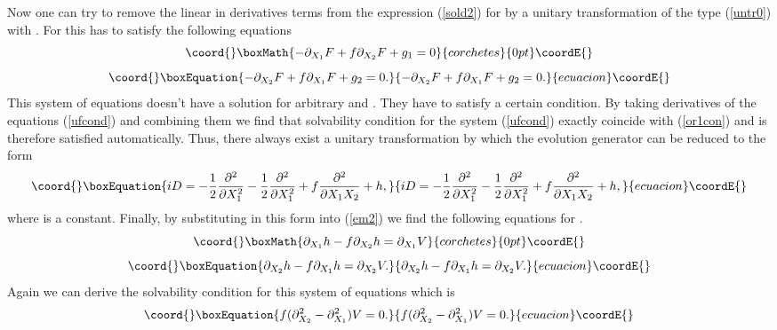 \documentclass[a4paper,11pt]{article}
\begin{document}
Now one can try to remove the linear in derivatives terms from the
expression (\ref{sold2}) for \coordHE{} by a unitary transformation of
the type (\ref{untr0}) with \coordHE{}. For this \coordHE{} has to
satisfy the following equations
\begin{displaymath}\coord{}\boxMath{
-\partial_{X_1}F+f\partial_{X_2}F+g_1=0
}{corchetes}{0pt}\coordE{}\end{displaymath}
\begin{equation}\coord{}\boxEquation{
-\partial_{X_2}F+f\partial_{X_1}F+g_2=0. \label{ufcond}
}{
-\partial_{X_2}F+f\partial_{X_1}F+g_2=0. }{ecuacion}\coordE{}\end{equation}
This system of equations doesn't have a solution for arbitrary
\coordHE{} and \coordHE{}. They have to satisfy a certain condition. By
taking derivatives of the equations (\ref{ufcond}) and combining
them we find that solvability condition for the system
(\ref{ufcond}) exactly coincide with (\ref{or1con}) and is
therefore satisfied automatically. Thus, there always exist a
unitary transformation by which the evolution generator can be
reduced to the form
\begin{equation}\coord{}\boxEquation{
iD=-\frac{1}{2}\frac{\partial^2}{\partial X_1^2}-
\frac{1}{2}\frac{\partial^2}{\partial X_1^2}+
f\frac{\partial^2}{\partial X_1 X_2 }+h, \label{sold2r}
}{
iD=-\frac{1}{2}\frac{\partial^2}{\partial X_1^2}-
\frac{1}{2}\frac{\partial^2}{\partial X_1^2}+
f\frac{\partial^2}{\partial X_1 X_2 }+h, }{ecuacion}\coordE{}\end{equation}
where \coordHE{} is a constant. Finally, by substituting \coordHE{} in this form
into (\ref{em2}) we find the following equations for \coordHE{}.
\begin{displaymath}\coord{}\boxMath{
\partial_{X_1}h-f\partial_{X_2}h=\partial_{X_1}V
}{corchetes}{0pt}\coordE{}\end{displaymath}
\begin{equation}\coord{}\boxEquation{
\partial_{X_2}h-f\partial_{X_1}h=\partial_{X_2}V. \label{heq}
}{
\partial_{X_2}h-f\partial_{X_1}h=\partial_{X_2}V. }{ecuacion}\coordE{}\end{equation}
Again we can derive the solvability condition for this system of
equations which is
\begin{equation}\coord{}\boxEquation{
f(\partial^2_{X_2}-\partial^2_{X_1})V=0. \label{hcond}
}{
f(\partial^2_{X_2}-\partial^2_{X_1})V=0. }{ecuacion}\coordE{}\end{equation}
\end{document}
